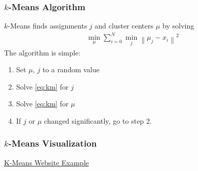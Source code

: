 \begin{frame}
    \frametitle{$k$-Means Algorithm}
    $k$-Means finds assignments $j$ and cluster centers $\mu$ by solving
    \begin{align}
        \min_{\mu}\sum_{i=0}^{N} \min_j\left\|\mu_j-x_i\right\|^2
        \label{eq:km}
    \end{align}
    The algorithm is simple:
    \begin{enumerate}
        \item Set $\mu$, $j$ to a random value
        \item Solve \eqref{eq:km} for $j$
        \item Solve \eqref{eq:km} for $\mu$
        \item If $j$ or $\mu$ changed significantly, go to step 2.
    \end{enumerate}
\end{frame}

\begin{frame}
    \frametitle{$k$-Means Visualization}
    \begin{center}
    \href{http://icperformance.com/wp-content/demos/kmeansmouse.html}{K-Means 
        Website Example}
    \end{center}
\end{frame}

